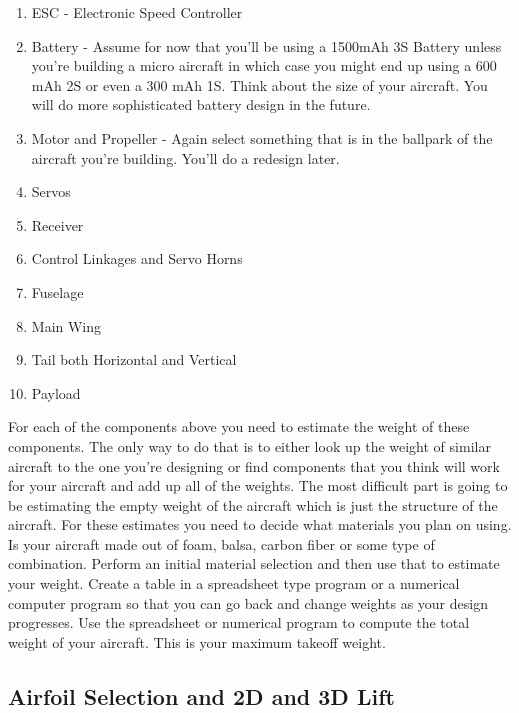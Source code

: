 \documentclass{article}
\begin{document}
\begin{enumerate}[itemsep=-5pt]
\item ESC - Electronic Speed Controller
\item Battery - Assume for now that you'll be using a 1500mAh 3S 
  Battery unless you're building a micro aircraft in which case you
  might end up using a 600 mAh 2S or even a 300 mAh 1S. Think about
  the size of your aircraft. You will do more sophisticated battery
  design in the future.
\item Motor and Propeller - Again select something that is in the
  ballpark of the aircraft you're building. You'll do a redesign later.
\item Servos
\item Receiver
\item Control Linkages and Servo Horns
\item Fuselage
\item Main Wing
\item Tail both Horizontal and Vertical
\item Payload
\end{enumerate}

For each of the components above you need to estimate the weight of
these components. The only way to do that is to either look up the
weight of similar aircraft to the one you're designing or find
components that you think will work for your aircraft and add up all
of the weights. The most difficult part is going to be estimating the
empty weight of the aircraft which is just the structure of the
aircraft. For these estimates you need to decide what materials you
plan on using. Is your aircraft made out of foam, balsa, carbon fiber
or some type of combination. Perform an initial material selection and
then use that to estimate your weight. Create a table in a spreadsheet
type program or a numerical computer program so that you can go back
and change weights as your design progresses. Use the spreadsheet or
numerical program to compute the total weight of your aircraft. This
is your maximum takeoff weight.

\subsection{Airfoil Selection and 2D and 3D Lift}
\end{document}

